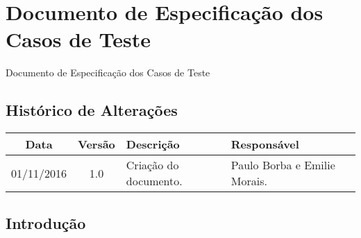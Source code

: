 \chapter{Documento de Especificação dos Casos de Teste} \label{documento_teste}

\begin{center}
 {\large Documento de Especificação dos Casos de Teste}\\[0.2cm]
 \end{center}

 \section*{Histórico de Alterações}
\begin{table}[h]
\centering
\begin{tabular}{|c|c|p{6cm}|p{5cm}|}
\hline
Data & Versão & Descrição & Responsável\\
\hline
01/11/2016 & 1.0 & Criação do documento. & Paulo Borba e Emilie Morais.\\
\hline
\end{tabular}
\end{table}

\section*{Introdução}

